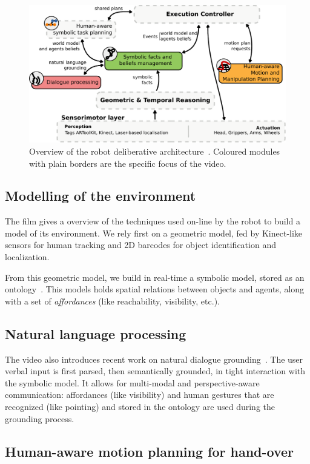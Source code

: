 \documentclass[conference]{IEEEtran}
\begin{document}
\begin{figure}[h!]
        \centering
        \includegraphics[width=0.9\columnwidth]{archi}
        \caption{Overview of the robot deliberative
        architecture~\cite{Alami2011a}. Coloured modules with plain borders are
        the specific focus of the video.}
        \label{fig|archi}
\end{figure}

\subsection{Modelling of the environment}

The film gives a overview of the techniques used on-line by the robot
to build a model of its environment. We rely first on a geometric model, fed by
Kinect-like sensors for human tracking and 2D barcodes for object identification
and localization.

From this geometric model, we build in real-time a symbolic model, stored as an
ontology~\cite{Lemaignan2010}. This models holds spatial relations between
objects and agents, along with a set of \emph{affordances} (like reachability,
visibility, etc.).

\subsection{Natural language processing}

The video also introduces recent work on natural dialogue
grounding~\cite{Lemaignan2011a}. The user verbal input is first parsed, then
semantically grounded, in tight interaction with the symbolic model. It allows
for multi-modal and perspective-aware communication: affordances (like
visibility) and human gestures that are recognized (like pointing) and stored
in the ontology are used during the grounding process.

\subsection{Human-aware motion planning for hand-over}
\end{document}

